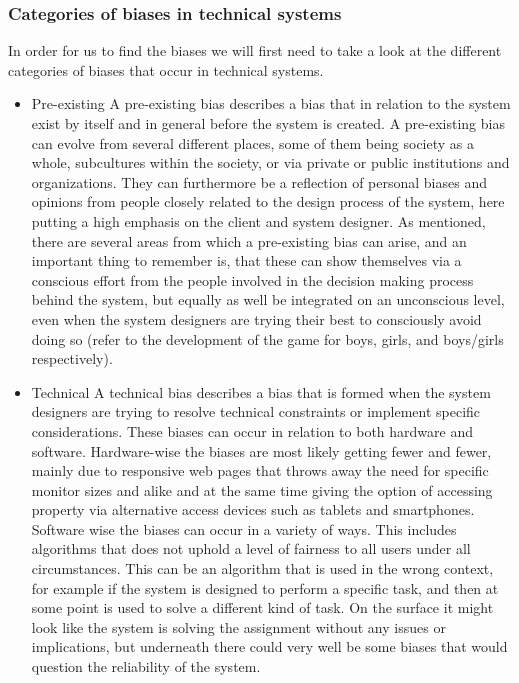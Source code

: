 \subsubsection{Categories of biases in technical systems}

In order for us to find the biases we will first need to take a look at the different categories of biases that occur in technical systems.
\begin{itemize}
	\item Pre-existing
A pre-existing bias describes a bias that in relation to the system exist by itself and in general before the system is created. A pre-existing bias can evolve from several different places, some of them being society as a whole, subcultures within the society, or via private or public institutions and organizations. They can furthermore be a reflection of personal biases and opinions from people closely related to the design process of the system, here putting a high emphasis on the client and system designer.
As mentioned, there are several areas from which a pre-existing bias can arise, and an important thing to remember is, that these can show themselves via a conscious effort from the people involved in the decision making process behind the system, but equally as well be integrated on an unconscious level, even when the system designers are trying their best to consciously avoid doing so (refer to the development of the game for boys, girls, and boys/girls respectively).
	\item Technical
A technical bias describes a bias that is formed when the system designers are trying to resolve technical constraints or implement specific considerations. These biases can occur in relation to both hardware and software. Hardware-wise the biases are most likely getting fewer and fewer, mainly due to responsive web pages that throws away the need for specific monitor sizes and alike and at the same time giving the option of accessing property via alternative access devices such as tablets and smartphones. 
Software wise the biases can occur in a variety of ways. This includes algorithms that does not uphold a level of fairness to all users under all circumstances. This can be an algorithm that is used in the wrong context, for example if the system is designed to perform a specific task, and then at some point is used to solve a different kind of task. On the surface it might look like the system is solving the assignment without any issues or implications, but underneath there could very well be some biases that would question the reliability of the system.

\end{itemize}
